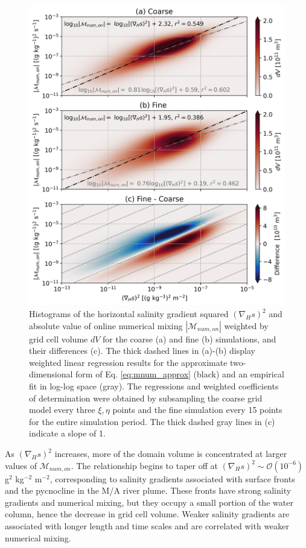 \begin{figure}
 \centerline{\includegraphics[width =0.9\linewidth]{figures/james_2023/Figure11_sgradmag_histogram.jpg}}
  \caption{Histograms of the horizontal salinity gradient squared $(\nabla_H s)^2$ and absolute value of online numerical mixing $|\mathcal{M}_{num, on}|$ weighted by grid cell volume $dV$ for the coarse (a) and fine (b) simulations, and their differences (c). The thick dashed lines in (a)-(b) display weighted linear regression results for the approximate two-dimensional form of Eq. \ref{eq:mnum_approx} (black) and an empirical fit in log-log space (gray). The regressions and weighted coefficients of determination were obtained by subsampling the coarse grid model every three $\xi,\eta$ points and the fine simulation every 15 points for the entire simulation period. The thick dashed gray lines in (c) indicate a slope of 1.}
  \label{fig:mnum_sgrad}
\end{figure}

As $(\nabla_H s)^2$ increases, more of the domain volume is concentrated at larger values of $\mathcal{M}_{num, on}$. The relationship begins to taper off at $(\nabla_H s)^2 \sim \mathcal{O}(10^{-6})$ g$^2$ kg$^{-2}$ m$^{-2}$, corresponding to salinity gradients associated with surface fronts and the pycnocline in the M/A river plume. These fronts have strong salinity gradients and numerical mixing, but they occupy a small portion of the water column, hence the decrease in grid cell volume. Weaker salinity gradients are associated with longer length and time scales and are correlated with weaker numerical mixing. 

